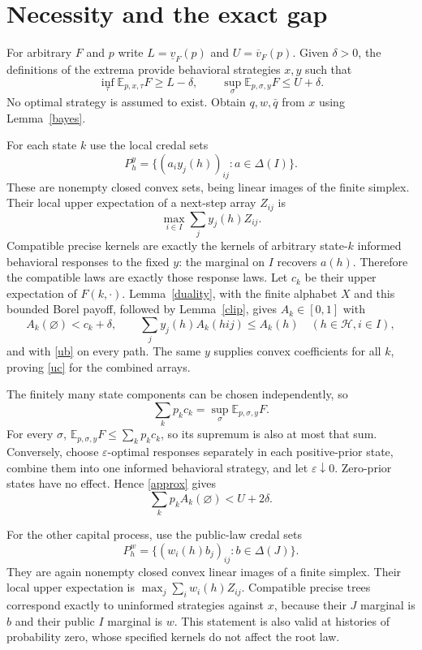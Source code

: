 \documentclass[11pt,a4paper]{article}
\theoremstyle{definition}
\newcommand{\E}{\mathbb E}
\newcommand{\HH}{\mathcal H}
\newcommand{\lv}{\underline v}
\newcommand{\uv}{\overline v}
\begin{document}
\section{Necessity and the exact gap}

For arbitrary $F$ and $p$ write $L=\lv_F(p)$ and $U=\uv_F(p)$. Given
$\delta>0$, the definitions of the extrema provide behavioral strategies
$x,y$ such that
\begin{equation}
 \inf_\tau\E_{p,x,\tau}F\geq L-\delta,
 \qquad \sup_\sigma\E_{p,\sigma,y}F\leq U+\delta.
 \label{approx}
\end{equation}
No optimal strategy is assumed to exist. Obtain $q,w,\bar q$ from $x$
using Lemma~\ref{bayes}.

For each state $k$ use the local credal sets
\[
 P_h^y=\{(a_i y_j(h))_{ij}:a\in\Delta(I)\}.
\]
These are nonempty closed convex sets, being linear images of the
finite simplex. Their local upper expectation of a next-step array
$Z_{ij}$ is
\[
 \max_{i\in I}\sum_j y_j(h)Z_{ij}.
\]
Compatible precise kernels are exactly the kernels of arbitrary
state-$k$ informed behavioral responses to the fixed $y$: the marginal
on $I$ recovers $a(h)$. Therefore the compatible laws are exactly those
response laws. Let $c_k$ be their upper expectation of $F(k,\cdot)$.
Lemma~\ref{duality}, with the finite alphabet $X$ and this bounded Borel
payoff, followed by Lemma~\ref{clip}, gives $A_k\in[0,1]$ with
\[
 A_k(\varnothing)<c_k+\delta,\qquad
 \sum_j y_j(h)A_k(hij)\leq A_k(h)\quad(h\in\HH,i\in I),
\]
and with \eqref{ub} on every path. The same $y$ supplies convex
coefficients for all $k$, proving \eqref{uc} for the combined arrays.

The finitely many state components can be chosen independently, so
\begin{equation}
 \sum_k p_k c_k=\sup_\sigma\E_{p,\sigma,y}F.
 \label{statewise}
\end{equation}
For every $\sigma$, $\E_{p,\sigma,y}F\leq\sum_k p_k c_k$, so its
supremum is also at most that sum. Conversely, choose
$\varepsilon$-optimal responses separately in each positive-prior state,
combine them into one informed behavioral strategy, and let
$\varepsilon\downarrow0$. Zero-prior states have no effect. Hence
\eqref{approx} gives
\begin{equation}
 \sum_k p_k A_k(\varnothing)<U+2\delta.
 \label{acost}
\end{equation}

For the other capital process, use the public-law credal sets
\[
 P_h^w=\{(w_i(h)b_j)_{ij}:b\in\Delta(J)\}.
\]
They are again nonempty closed convex linear images of a finite
simplex. Their local upper expectation is
$\max_j\sum_i w_i(h)Z_{ij}$. Compatible precise trees correspond exactly
to uninformed strategies against $x$, because their $J$ marginal is
$b$ and their public $I$ marginal is $w$. This statement is also valid
at histories of probability zero, whose specified kernels do not
affect the root law.
\end{document}
